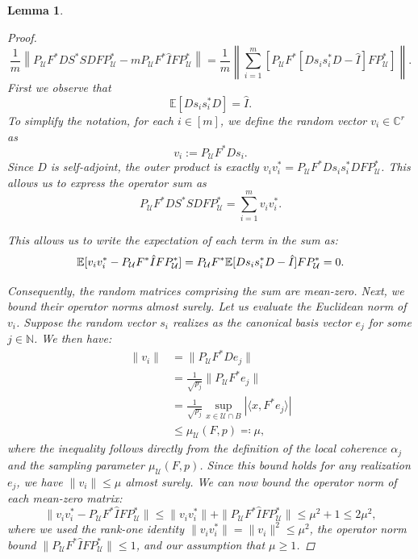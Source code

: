 \documentclass[a4paper,oneside]{amsart}
\newtheorem{lemma}[theorem]{Lemma}
\begin{document}
\begin{lemma}
\begin{proof}
        \begin{equation*}\label{summ}
            \frac{1}{m}\left\|P_{\mathcal{U}} F^* D S^* S D F P_{\mathcal{U}}^*-m P_{\mathcal{U}} F^*\hat{I} F P_{\mathcal{U}}^*\right\| = \frac{1}{m}\left\|\sum_{i=1}^m\left[P_{\mathcal{U}} F^* \left[ D s_i s_i^* D - \hat{I} \right]F P_{\mathcal{U}}^*\right]\right\|.
        \end{equation*}
        First we observe that
        \begin{equation*}
            \mathbb{E}[D s_i s_i^* D] = \hat{I}.
        \end{equation*}
        To simplify the notation, for each $i \in [m]$, we define the random vector $v_i \in \mathbb{C}^r$ as
\begin{equation*}
v_i := P_{\mathcal{U}} F^* D s_i.
\end{equation*}
Since $D$ is self-adjoint, the outer product is exactly $v_i v_i^* = P_{\mathcal{U}} F^* D s_i s_i^* D F P_{\mathcal{U}}^*$. This allows us to express the operator sum as
\begin{equation*}
P_{\mathcal{U}} F^* D S^* S D F P_{\mathcal{U}}^* = \sum_{i=1}^m v_i v_i^*.
\end{equation*}
        
      This allows us to write the expectation of each term in the sum as:
      \begin{equation}\notag
      \mathbb{E}[v_i v_i^* - P_{\mathcal{U}} F^*\hat{I} F P_{\mathcal{U}}^*] = P_{\mathcal{U}} F^* \mathbb{E}[D s_i s_i^* D - \hat{I}] F P_{\mathcal{U}}^* = 0.
      \end{equation}
      
      Consequently, the random matrices comprising the sum are mean-zero. Next, we bound their operator norms almost surely. Let us evaluate the Euclidean norm of $v_i$. Suppose the random vector $s_i$ realizes as the canonical basis vector $e_j$ for some $j \in \mathbb{N}$. We then have:
      \begin{align*}\|v_i \| &= \| P_\mathcal{U} F^* D e_j \| \\ 
      &= \frac{1}{\sqrt{p_j}} \| P_\mathcal{U} F^* e_j \| \\
      &= \frac{1}{\sqrt{p_j}} \sup_{x\in \mathcal{U} \cap B} |\langle x, F^* e_j \rangle| \\
      &\leq \mu_{\mathcal{U}}(F,p) \eqqcolon \mu,
      \end{align*}
      where the inequality follows directly from the definition of the local coherence $\alpha_j$ and the sampling parameter $\mu_{\mathcal{U}}(F,p)$. Since this bound holds for any realization $e_j$, we have $\|v_i\| \le \mu$ almost surely. We can now bound the operator norm of each mean-zero matrix:
      \begin{equation*}\| v_i v_i^* - P_{\mathcal{U}} F^* \hat{I} F P_{\mathcal{U}}^*\| \leq \|v_i v_i^*\| + \| P_{\mathcal{U}} F^* \hat{I} F P_{\mathcal{U}}^* \| \leq \mu^2 + 1 \leq 2\mu^2,
      \end{equation*}
      where we used the rank-one identity $\|v_i v_i^*\| = \|v_i\|^2 \leq \mu^2$, the operator norm bound $\| P_{\mathcal{U}} F^*\hat{I} F P_{\mathcal{U}}^* \| \leq 1$, and our assumption that $\mu \ge 1$.


\end{proof}
\end{lemma}
\end{document}
